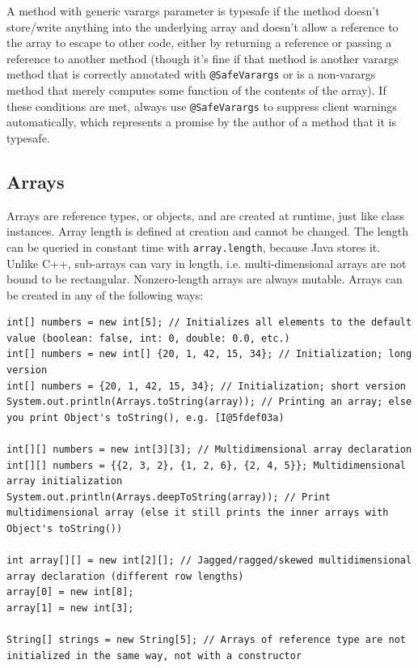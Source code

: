 \documentclass[table, xcdraw]{article}%
\begin{document}
A method with generic varargs parameter is typesafe if the method doesn't store/write anything into the underlying array and doesn't allow a reference to the array to escape to other code, either by returning a reference or passing a reference to another method (though it's fine if that method is another varargs method that is correctly annotated with \texttt{@SafeVarargs} or is a non-varargs method that merely computes some function of the contents of the array). If these conditions are met, always use \texttt{@SafeVarargs} to suppress client warnings automatically, which represents a promise by the author of a method that it is typesafe.

\subsection{Arrays}

Arrays are reference types, or objects, and are created at runtime, just like class instances. Array length is defined at creation and cannot be changed. The length can be queried in constant time with \texttt{array.length}, because Java stores it. Unlike C++, sub-arrays can vary in length, i.e. multi-dimensional arrays are not bound to be rectangular. Nonzero-length arrays are always mutable. Arrays can be created in any of the following ways:

\begin{verbatim}
int[] numbers = new int[5]; // Initializes all elements to the default value (boolean: false, int: 0, double: 0.0, etc.)
int[] numbers = new int[] {20, 1, 42, 15, 34}; // Initialization; long version
int[] numbers = {20, 1, 42, 15, 34}; // Initialization; short version
System.out.println(Arrays.toString(array)); // Printing an array; else you print Object's toString(), e.g. [I@5fdef03a)

int[][] numbers = new int[3][3]; // Multidimensional array declaration
int[][] numbers = {{2, 3, 2}, {1, 2, 6}, {2, 4, 5}}; Multidimensional array initialization
System.out.println(Arrays.deepToString(array)); // Print multidimensional array (else it still prints the inner arrays with Object's toString())

int array[][] = new int[2][]; // Jagged/ragged/skewed multidimensional array declaration (different row lengths)
array[0] = new int[8];
array[1] = new int[3];

String[] strings = new String[5]; // Arrays of reference type are not initialized in the same way, not with a constructor
\end{verbatim}
\end{document}
